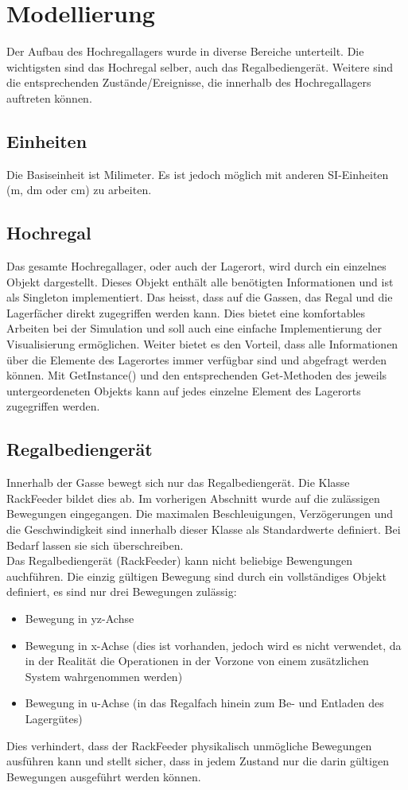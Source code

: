 \section{Modellierung}
Der Aufbau des Hochregallagers wurde in diverse Bereiche unterteilt. Die wichtigsten sind das Hochregal selber, auch das Regalbediengerät. Weitere sind die entsprechenden Zustände/Ereignisse, die innerhalb des Hochregallagers auftreten können. 
%
\subsection{Einheiten}
Die Basiseinheit ist Milimeter. Es ist jedoch möglich mit anderen SI-Einheiten (m, dm oder cm) zu arbeiten.
%
\subsection{Hochregal}
Das gesamte Hochregallager, oder auch der Lagerort, wird durch ein einzelnes Objekt dargestellt. Dieses Objekt enthält alle benötigten Informationen und ist als Singleton implementiert. Das heisst, dass auf die Gassen, das Regal und die Lagerfächer direkt zugegriffen werden kann. Dies bietet eine komfortables Arbeiten bei der Simulation und soll auch eine einfache Implementierung der Visualisierung ermöglichen. Weiter bietet es den Vorteil, dass alle Informationen über die Elemente des Lagerortes immer verfügbar sind und abgefragt werden können. Mit GetInstance() und den entsprechenden Get-Methoden des jeweils untergeordeneten Objekts kann auf jedes einzelne Element des Lagerorts zugegriffen werden.
%
\subsection{Regalbediengerät}
Innerhalb der Gasse bewegt sich nur das Regalbediengerät. Die Klasse RackFeeder bildet dies ab. Im vorherigen Abschnitt wurde auf die zulässigen Bewegungen eingegangen. Die maximalen Beschleuigungen, Verzögerungen und die Geschwindigkeit sind innerhalb dieser Klasse als Standardwerte definiert. Bei Bedarf lassen sie sich überschreiben.\\
Das Regalbediengerät (RackFeeder) kann nicht beliebige Bewengungen auchführen. Die einzig gültigen Bewegung sind durch ein vollständiges Objekt definiert, es sind nur drei Bewegungen zulässig: 
%
\begin{itemize}
  \item Bewegung in yz-Achse
  \item Bewegung in x-Achse (dies ist vorhanden, jedoch wird es nicht verwendet, da in der Realität die Operationen in der Vorzone von einem zusätzlichen System wahrgenommen werden)
  \item Bewegung in u-Achse (in das Regalfach hinein zum Be- und Entladen des Lagergütes)
\end{itemize}
%
Dies verhindert, dass der RackFeeder physikalisch unmögliche Bewegungen ausführen kann und stellt sicher, dass in jedem Zustand nur die darin gültigen Bewegungen ausgeführt werden können.
%

